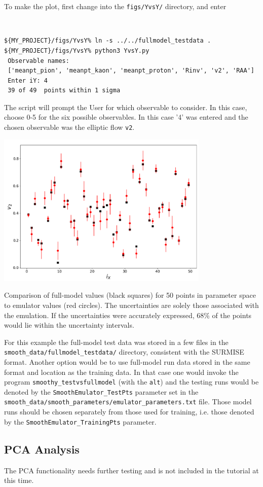 \documentclass[UserManual.tex]{subfiles}
\begin{document}
To make the plot, first change into the {\tt figs/YvsY/} directory, and enter
{\tt
\begin{verbatim}
${MY_PROJECT}/figs/YvsY% ln -s ../../fullmodel_testdata .
${MY_PROJECT}/figs/YvsY% python3 YvsY.py
 Observable names:
 ['meanpt_pion', 'meanpt_kaon', 'meanpt_proton', 'Rinv', 'v2', 'RAA']
 Enter iY: 4
 39 of 49  points within 1 sigma
\end{verbatim}}
The script will prompt the User for which observable to consider. In this case, choose 0-5 for the six possible observables. In this case '4' was entered and the chosen observable was the elliptic flow {\tt v2}. 
\parbox{4.5in}{\centerline{\includegraphics[width=4.0in]{YvsY_rhic.pdf}}}
\parbox{2.25in}{Comparison of full-model values (black squares) for 50 points in parameter space to emulator values (red circles). The uncertainties are solely those associated with the emulation. If the uncertainties were accurately expressed, 68\% of the points would lie within the uncertainty intervals.}

For this example the full-model test data was stored in a few files in the {\tt smooth\_data/fullmodel\_testdata/} directory, consistent with the SURMISE format. Another option would be to use full-model run data stored in the same format and location as the training data. In that case one would invoke the program {\tt smoothy\_testvsfullmodel} (with the {\tt alt}) and the testing runs would be denoted by the {\tt SmoothEmulator\_TestPts} parameter set in the {\tt smooth\_data/smooth\_parameters/emulator\_parameters.txt} file. Those model runs should be chosen separately from those used for training, i.e. those denoted by the {\tt SmoothEmulator\_TrainingPts} parameter.

\subsection{PCA Analysis}
The PCA functionality needs further testing and is not included in the tutorial at this time.
\end{document}
